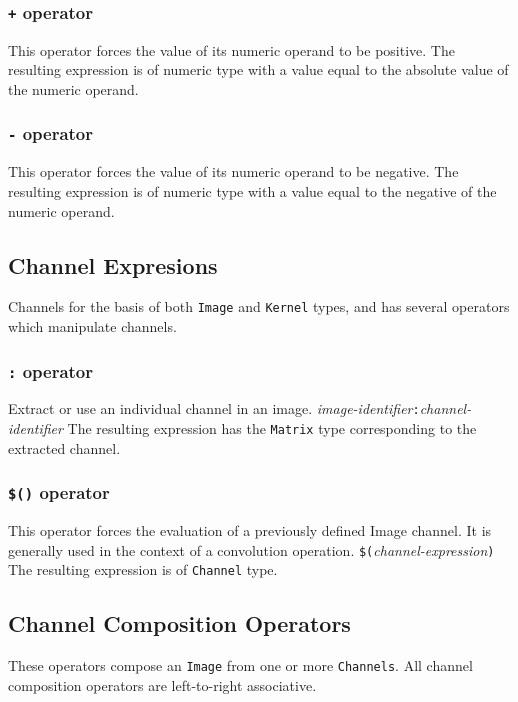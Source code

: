 \subsubsection{\texttt{+} operator}
This operator forces the value of its numeric operand to be positive.
The resulting expression is of numeric type with a value equal to the
absolute value of the numeric operand.

\subsubsection{\texttt{-} operator}
This operator forces the value of its numeric operand to be negative.
The resulting expression is of numeric type with a value equal to the
negative of the numeric operand.

\subsection{Channel Expresions}
\label{ssec:channelexpressions}
Channels for the basis of both \texttt{Image} and \texttt{Kernel} types, and
\sys{} has several operators which manipulate channels.

\subsubsection{\texttt{:} operator}
\label{sssec:colonop}
Extract or use an individual channel in an image.
\startsyn
\emph{image-identifier}\texttt{:}\emph{channel-identifier}
\stopsyn
The resulting expression has the \texttt{Matrix} type corresponding to the
extracted channel.

\subsubsection{\texttt{\$()} operator}
\label{sssec:evalop}
This operator forces the evaluation of a previously defined Image channel. It
is generally used in the context of a convolution operation.
\startsyn
\texttt{\$(}\emph{channel-expression}\texttt{)}
\stopsyn
The resulting expression is of \texttt{Channel} type.

\subsection{Channel Composition Operators}
\label{ssec:channelops}
These operators compose an \texttt{Image} from one or more \texttt{Channels}.
All channel composition operators are left-to-right associative.

